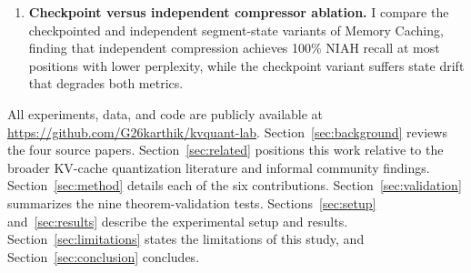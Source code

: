 \begin{enumerate}[noitemsep,topsep=1pt,parsep=0pt,partopsep=0pt]
\item \textbf{Checkpoint versus independent compressor ablation.}
I compare the checkpointed and independent segment-state variants of
Memory Caching, finding that independent compression achieves 100\%
NIAH recall at most positions with lower perplexity, while the
checkpoint variant suffers state drift that degrades both metrics.

\end{enumerate}

\noindent
All experiments, data, and code are publicly available at \url{https://github.com/G26karthik/kvquant-lab}.
Section~\ref{sec:background} reviews the four source papers.
Section~\ref{sec:related} positions this work relative to the broader
KV-cache quantization literature and informal community findings.
Section~\ref{sec:method} details each of the six contributions.
Section~\ref{sec:validation} summarizes the nine theorem-validation tests.
Sections~\ref{sec:setup} and~\ref{sec:results} describe the experimental
setup and results.
Section~\ref{sec:limitations} states the limitations of this study,
and Section~\ref{sec:conclusion} concludes.
